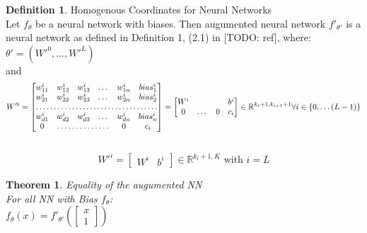 \documentclass[a4paper]{article}
\newtheorem{theorem}{Theorem}[section]
\theoremstyle{definition}
\newtheorem{definition}{Definition}[section]
\begin{document}
\theoremstyle{definition}
\begin{definition}{Homogenous Coordinates for Neural Networks}\\
Let $f_{\theta}$ be a neural network with biases. Then augumented neural network $f'_{\theta'}$ is a neural network as defined in Definition 1, (2.1) in [TODO: ref], where:\\
$\theta' = (W'^0, \dots, W'^L)$\\
and\\
\[
W'^i=\begin{bmatrix}
    w_{11}^i       & w_{12}^i & w_{13}^i & \dots & w_{1n}^i & bias_1^i\\
    w_{21}^i       & w_{22}^i & w_{23}^i & \dots & w_{2n}^i & bias_2^i\\
    \hdotsfor{6} \\
	w_{d1}^i       & w_{d2}^i & w_{d3}^i & \dots & w_{dn}^i & bias_n^i\\
	0 & \hdotsfor{3} & 0 & c_i
\end{bmatrix}
= 
\begin{bmatrix}
    W^i & & & b^i\\
	0 & \dots & 0 & c_i
\end{bmatrix} \in \mathbb{R}^{k_i + 1, k_{i + 1} + 1}  \forall i \in \{0, \dots (L-1)\}
\]\\
\[
W'^i=
\begin{bmatrix}
    W^i & b^i
\end{bmatrix} \in \mathbb{R}^{k_i + 1, K}  \text{ with } i = L
\]
\end{definition}

\begin{theorem}{Equality of the augumented NN}\\
For all NN with Bias $f_{\theta}$:\\
$f_{\theta}(x)=f'_{\theta'}(\begin{bmatrix}     x\\     1 \end{bmatrix})$
\end{theorem}
\end{document}
